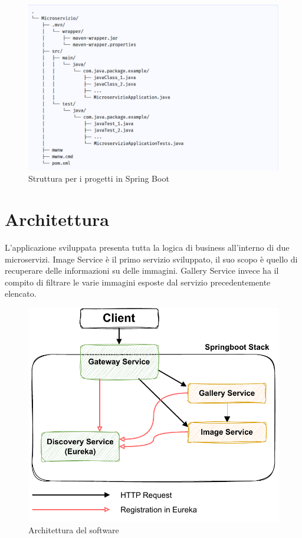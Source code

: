 \begin{figure}[h!]
    \centering
    \includegraphics[scale = 0.60]{capitoli/immagini/11_maven_tree.pdf}
    \caption{Struttura per i progetti in Spring Boot}
    \label{fig:maven_structure_springboot}
\end{figure}

\section{Architettura}

L'applicazione sviluppata presenta tutta la logica di business all'interno di due microservizi. Image Service è il primo servizio sviluppato, il suo scopo è quello di recuperare delle informazioni su delle immagini. Gallery Service invece ha il compito di filtrare le varie immagini esposte dal servizio precedentemente elencato.

\begin{figure}[h]
    \centering
    \includegraphics[scale = 0.65]{capitoli/immagini/12_architettura_hello_world.pdf}
    \caption{Architettura del software}
    \label{fig:architettura_hello_worlds}
\end{figure}

